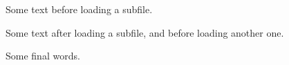 \documentclass{article}
\begin{document}
Some text before loading a subfile.



Some text after loading a subfile, and before loading another one.



Some final words.
\end{document}

